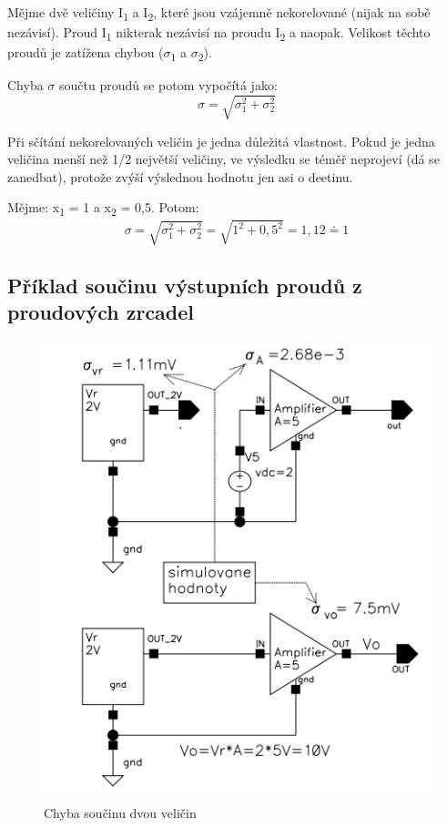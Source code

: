 Mějme dvě veličiny I\textsubscript{1} a I\textsubscript{2}, které jsou vzájemně nekorelované (nijak na sobě nezávisí). Proud I\textsubscript{1} nikterak nezávisí na proudu I\textsubscript{2} a naopak. Velikost těchto proudů je zatížena chybou ($\sigma$\textsubscript{1} a $\sigma$\textsubscript{2}).

Chyba $\sigma$ součtu proudů se potom vypočítá jako:
\begin{equation}
\sigma = \sqrt{\sigma_{1}^{2}+\sigma_{2}^{2}}
\end{equation}

Při sčítání nekorelovaných veličin je jedna důležitá vlastnost. Pokud je jedna veličina menší než 1/2 největší veličiny, ve výsledku se téměř neprojeví (dá se zanedbat), protože zvýší výslednou hodnotu jen asi o deetinu.

Mějme: x\textsubscript{1} = 1 a x\textsubscript{2} = 0,5. Potom:
\begin{equation}
\sigma = \sqrt{\sigma_{1}^{2}+\sigma_{2}^{2}}=\sqrt{1^{2}+0,5^{2}}=1,12\doteq 1
\end{equation}

\subsection{Příklad součinu výstupních proudů z proudových zrcadel}

\begin{figure}[h]
   \begin{center}
     \includegraphics[scale=0.5]{images/Chyba_Soucinu.png}
   \end{center}
   \caption{Chyba součinu dvou veličin}
\end{figure}

